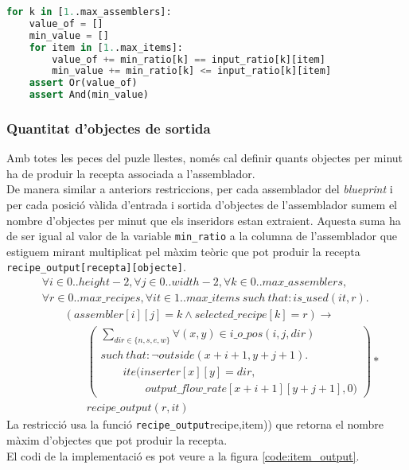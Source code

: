 \begin{lstlisting}[language=Python, caption=Min Ratio, label=code:min_ratio]
for k in [1..max_assemblers]:
    value_of = []
    min_value = []
    for item in [1..max_items]:
        value_of += min_ratio[k] == input_ratio[k][item]
        min_value += min_ratio[k] <= input_ratio[k][item]
    assert Or(value_of)
    assert And(min_value)
\end{lstlisting}

\subsubsection{Quantitat d'objectes de sortida}
Amb totes les peces del puzle llestes, només cal definir quants objectes per minut ha de produir la recepta associada a l'assemblador.\\
De manera similar a anteriors restriccions, per cada assemblador del \textit{blueprint} i per cada posició vàlida d'entrada i sortida d'objectes de l'assemblador sumem el nombre d'objectes per minut que els inseridors estan extraient. Aquesta suma ha de ser igual al valor de la variable \lstinline{min_ratio} a la columna de l'assemblador que estiguem mirant multiplicat pel màxim teòric que pot produir la recepta \lstinline{recipe_output[recepta][objecte]}.
\begin{align*}
    &\forall i \in 0..height-2, \forall j \in 0..width-2, \forall k \in 0..max\_assemblers,\\
    &\forall r \in 0..max\_recipes, \forall it \in 1..max\_items \ such \ that: is\_used(it, r).\\
    &\qquad (assembler[i][j]=k \land selected\_recipe[k]=r)\rightarrow\\
    &\qquad \qquad \left(\begin{array}{l}
        \sum_{dir\in\{n,s,e,w\}} \forall (x,y)\in i\_o\_pos(i,j,dir)\\
        such \ that: \lnot outside(x+i+1, y+j+1).\\
        \qquad ite\Big(inserter[x][y]=dir,\\
        \qquad \qquad output\_flow\_rate[x+i+1][y+j+1],0\Big)
    \end{array}\right) *\\
    &\qquad \qquad recipe\_output(r,it)
\end{align*}
La restricció usa la funció \lstinline(recipe_output(recipe,item)) que retorna el nombre màxim d'objectes que pot produir la recepta.\\
El codi de la implementació es pot veure a la figura \ref{code:item_output}.

